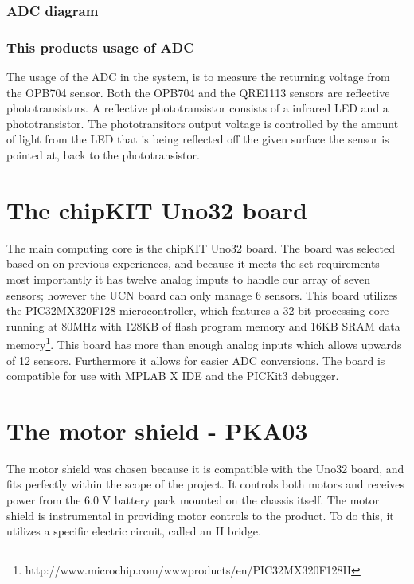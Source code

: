 \subsubsection{ADC diagram} 
\newpage
\subsubsection{This products usage of ADC}
The usage of the ADC in the system, is to measure the returning voltage from the OPB704 sensor. Both the OPB704 and the QRE1113 sensors are reflective phototransistors.
A reflective phototransistor consists of a infrared LED and a phototransistor.
The phototransitors output voltage is controlled by the amount of light from the LED that is being reflected off the given surface the sensor is pointed at, back to the phototransistor.

\section{The chipKIT Uno32 board}
The main computing core is the chipKIT Uno32 board. The board was selected based on on previous experiences, and because it meets the set requirements - most importantly it has twelve analog imputs to handle our array of seven sensors; however the UCN board can only manage 6 sensors. This board utilizes the PIC32MX320F128 microcontroller, which features a 32-bit processing core running at 80MHz with 128KB of flash program memory and 16KB SRAM data memory\footnote{http://www.microchip.com/wwwproducts/en/PIC32MX320F128H}. 
This board has more than enough analog inputs which allows upwards of 12 sensors. Furthermore it allows for easier ADC conversions.
The board is compatible for use with MPLAB X IDE and the PICKit3 debugger.

\section{The motor shield - PKA03}
The motor shield was chosen because it is compatible with the Uno32 board, and fits perfectly within the scope of the project. It controls both motors and receives power from the 6.0 V battery pack mounted on the chassis itself. The motor shield is instrumental in providing motor controls to the product. To do this, it utilizes a specific electric circuit, called an H bridge.
\newpage
